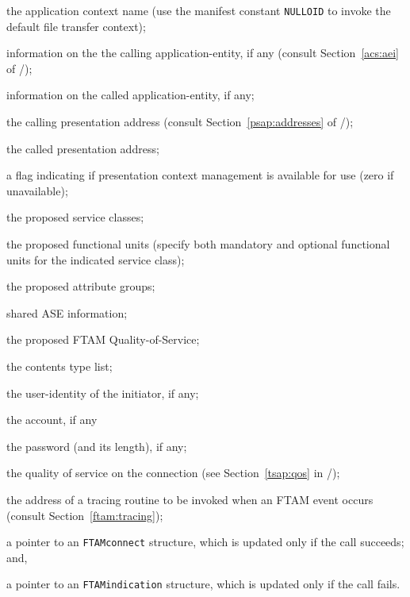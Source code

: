 \begin{describe}
\item[\verb"context":] the application context name
(use the manifest constant \verb"NULLOID" to invoke the default
file transfer context);

\item[\verb"callingtitle":] information on the the calling application-entity,
if any (consult Section~\ref{acs:aei} of \volone/);

\item[\verb"calledtitle":] information on the called application-entity,
if any;

\item[\verb"callingaddr":] the calling presentation address
(consult Section~\ref{psap:addresses} of \voltwo/);

\item[\verb"calledaddr":] the called presentation address;

\item[\verb"manage":] a flag indicating if presentation context management is
available for use (zero if unavailable);

\item[\verb"class":] the proposed service classes;

\item[\verb"units":] the proposed functional units
(specify both mandatory and optional functional units for the indicated
service class);

\item[\verb"attrs":] the proposed attribute groups;

\item[\verb"sharedASE":] shared ASE information;

\item[\verb"fqos":] the proposed FTAM Quality-of-Service;

\item[\verb"contents":] the contents type list;

\item[\verb"initiator":] the user-identity of the initiator, if any;

\item[\verb"account":] the account, if any

\item[\verb"password"/\verb"passlen":] the password (and its length), if any;

\item[\verb"qos":] the quality of service on the connection
(see Section~\ref{tsap:qos} in \voltwo/);

\item[\verb"tracing":] the address of a tracing routine to be invoked when an
FTAM event occurs (consult Section~\ref{ftam:tracing});

\item[\verb"ftc":] a pointer to an \verb"FTAMconnect" structure,
which is updated only if the call succeeds;
and,

\item[\verb"fti":] a pointer to an \verb"FTAMindication" structure,
which is updated only if the call fails.
\end{describe}
